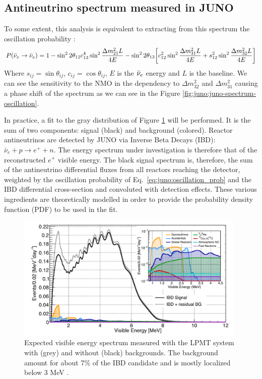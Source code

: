 \documentclass[../main.tex]{subfiles}
\begin{document}
\subsection{Antineutrino spectrum measured in JUNO}
\label{sec:juno:nom_precise_measurement}
To some extent, this analysis is equivalent to extracting from this spectrum the oscillation probability \cite{an_neutrino_2016}:
\begin{equation*}
  \label{eq:juno:oscillation_prob}
  P(\bar{\nu}_{e} \rightarrow \bar{\nu}_{e}) = 1 - \sin^2 2\theta_{12} c^4_{13} \sin^2 \frac{\Delta m^2_{21}L}{4E} - \sin^2 2\theta_{13} \bigg[ c_{12}^2 \sin^2 \frac{\Delta m_{31}^2 L}{4E} + s^2_{12} \sin^2 \frac{\Delta m_{32}^2 L}{4E} \bigg]
\end{equation*}
Where $s_{ij} = \sin \theta_{ij}$, $c_{ij} = \cos \theta_{ij}$, $E$ is the $\bar{\nu}_{e}$ energy and $L$ is the baseline.
We can see the sensitivity to the NMO in the dependency to $\Delta m_{32}^2$ and $\Delta m^2_{31}$ causing a phase shift of the spectrum as we can see in the Figure \ref{fig:juno:juno-spectrum-oscillation}.

In practice, a fit to the gray distribution of Figure \ref{fig:juno:spectrum_with_background} will be performed. It is the sum of two components: signal (black) and background (colored). Reactor antineutrinos are detected by JUNO via Inverse Beta Decays (IBD): $\bar{\nu}_e + p \rightarrow e^{+} + n$.
The energy spectrum under investigation is therefore that of the reconstructed $e^+$ visible energy. The black signal spectrum is, therefore, the sum of the antineutrino differential fluxes from all reactors reaching the detector, weighted by the oscillation probability of Eq.\ \ref{eq:juno:oscillation_prob} and the IBD differential cross-section and convoluted with detection effects.
These various ingredients are theoretically modelled in order to provide the probability density function (PDF) to be used in the fit.

\begin{figure}[ht]
  \centering
  \includegraphics[height=6cm]{images/juno/spectrum_with_background.png}
  \caption{Expected visible energy spectrum measured with the LPMT system with (grey) and without (black) backgrounds. The background amount for about 7\% of the IBD candidate and is mostly localized below 3 MeV \cite{juno_collaboration_sub-percent_2022}.}
  \label{fig:juno:spectrum_with_background}
\end{figure}
\end{document}
